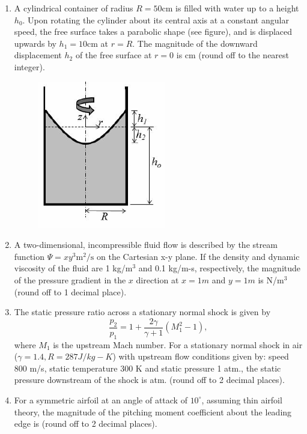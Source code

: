 \documentclass{article}
\begin{document}
\begin{enumerate}[leftmargin=*, resume]
\item A cylindrical container of radius \( R = 50  \text{cm} \) is filled with water up to a height \( h_0 \). Upon rotating the cylinder about its central axis at a constant angular speed, the free surface takes a parabolic shape (see figure), and is displaced upwards by \( h_1 = 10  \text{cm} \) at \( r = R \). The magnitude of the downward displacement \( h_2 \) of the free surface at \( r = 0 \) is \underline{\hspace{1.5cm}} cm (round off to the nearest integer).
\begin{figure}[H]
    \centering
    \includegraphics[width=0.2\linewidth]{figs/q42.png}
    \caption{}
    \label{fig:q42}
\end{figure}

\item A two-dimensional, incompressible fluid flow is described by the stream function \( \Psi = xy^3  \text{m}^2/\text{s} \) on the Cartesian x-y plane. If the density and dynamic viscosity of the fluid are 1 kg/m\(^3\) and 0.1 kg/m-s, respectively, the magnitude of the pressure gradient in the \( x \) direction at \( x=1  m \) and \( y=1  m \) is \underline{\hspace{1.5cm}} N/m\(^3\) (round off to 1 decimal place).

\item The static pressure ratio across a stationary normal shock is given by
\[
\frac{p_2}{p_1} = 1 + \frac{2\gamma}{\gamma + 1} (M_1^2 - 1),
\]
where \( M_1 \) is the upstream Mach number. For a stationary normal shock in air (\(\gamma = 1.4, R = 287  J/kg-K\)) with upstream flow conditions given by: speed 800 m/s, static temperature 300 K and static pressure 1 atm., the static pressure downstream of the shock is \underline{\hspace{1.5cm}} atm. (round off to 2 decimal places).

\item For a symmetric airfoil at an angle of attack of \(10^\circ\), assuming thin airfoil theory, the magnitude of the pitching moment coefficient about the leading edge is \underline{\hspace{1.5cm}} (round off to 2 decimal places).


\end{enumerate}
\end{document}
